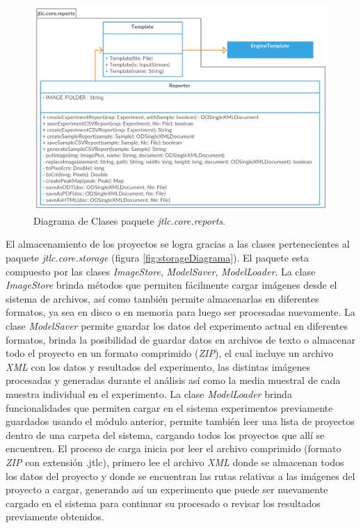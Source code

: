 \begin{figure}[H]
	\centering
	\includegraphics[width=425pt]{imagenes-jtlc/reports}
	\centering
	\vspace{-0.5cm}
	\caption{Diagrama de Clases paquete \textit{jtlc.core.reports}.}
	\label{fig:reportsDiagrama}
\end{figure}

El almacenamiento de los proyectos se logra gracias a las clases pertenecientes al paquete \textit{jtlc.core.storage} (figura \ref{fig:storageDiagrama}). El paquete esta compuesto por las clases \textit{ImageStore}, \textit{ModelSaver}, \textit{ModelLoader}. La clase \textit{ImageStore} brinda m\'etodos que permiten f\'acilmente cargar im\'agenes desde el sistema de archivos, as\'i como tambi\'en permite almacenarlas en diferentes formatos, ya sea en disco o en memoria para luego ser procesadas nuevamente. La clase \textit{ModelSaver} permite guardar los datos del experimento actual en diferentes formatos, brinda la posibilidad de guardar datos en archivos de texto o almacenar todo el proyecto en un formato comprimido (\textit{ZIP}), el cual incluye un archivo \textit{XML} con los datos y resultados del experimento, las distintas im\'agenes procesadas y generadas durante el an\'alisis as\'i como la media muestral de cada muestra individual en el experimento. La clase \textit{ModelLoader} brinda funcionalidades que permiten cargar en el sistema experimentos previamente guardados usando el m\'odulo anterior, permite tambi\'en leer una lista de proyectos dentro de una carpeta del sistema, cargando todos los proyectos que all\'i se encuentren. El proceso de carga inicia por leer el archivo comprimido (formato \textit{ZIP} con extensi\'on .jtlc), primero lee el archivo \textit{XML} donde se almacenan todos los datos del proyecto y donde se encuentran las rutas relativas a las im\'agenes del proyecto a cargar, generando as\'i un experimento que puede ser nuevamente cargado en el sistema para continuar su procesado o revisar los resultados previamente obtenidos.

